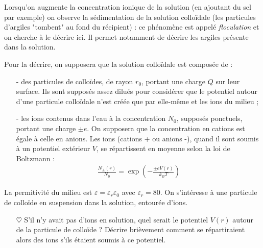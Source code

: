 \documentclass{report}
\begin{document}
Lorsqu'on augmente la concentration ionique de la solution (en ajoutant du sel par exemple) on observe la sédimentation de la solution colloïdale (les particules d'argiles "tombent" au fond du récipient) : ce phénomène est appelé \textit{floculation} et on cherche à le décrire ici. Il permet notamment de décrire les argiles présente dans la solution.


Pour la décrire, on supposera que la solution colloïdale est composée de :
\begin{itemize}
	\item[-] des particules de colloïdes, de rayon $r_0$, portant une charge $Q$ sur leur surface. Ils sont supposés assez dilués pour considérer que le potentiel autour d'une particule colloïdale n'est créée que par elle-même et les ions du milieu ;
	\item[-] les ions contenus dans l'eau à la concentration $N_0$, supposés ponctuels, portant une charge $\pm e$. On supposera que la concentration en cations est égale à celle en anions. Les ions (cations + ou anions -), quand il sont soumis à un potentiel extérieur $V$, se répartissent en moyenne selon la loi de Boltzmann :
\begin{align*}
	\frac{N_{\pm}(r)}{N_0}=\exp\left(-\frac{\pm eV(r)}{k_BT} \right) 
\end{align*}
\end{itemize}
La permitivité du milieu est $\varepsilon=\varepsilon_r\varepsilon_0$ avec $\varepsilon_r=80$. On s'intéresse à une particule de colloïde en suspension dans la solution, entourée d'ions.


\begin{itemize}

	\item[$\heartsuit$] S'il n'y avait pas d'ions en solution, quel serait le potentiel $V(r)$ autour de la particule de colloïde ? Décrire brièvement comment se répartiraient alors des ions s'ils étaient soumis à ce potentiel.

\end{itemize}
\end{document}
